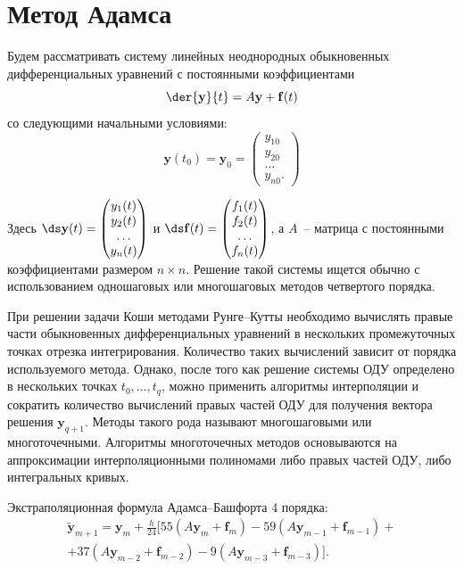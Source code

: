 \documentclass[14pt,final,titlepage,pscyr]{hedwork}
\renewcommand{\vec}[1]{\mathbf{#1}}
\begin{document}
\maketitle
\tableofcontents
\section{Метод Адамса}
  Будем рассматривать систему линейных неоднородных обыкновенных
  дифференциальных уравнений с постоянными коэффициентами
  \[
    \der{\vec{y}}{t} = A\vec{y} + \vec{f}(t)
  \]
  со следующими начальными условиями:
  \[
    \vec{y}(t_0) = \vec{y}_0 =
    \begin{pmatrix}
      y_{10} \\ y_{20} \\ \ldots \\ y_{n0}.
    \end{pmatrix}
  \]
  
  Здесь \( \ds \vec{y}(t) =
  \begin{pmatrix}y_1(t) \\ y_2(t) \\ \ldots \\ y_n(t) \end{pmatrix} \)
  и  \( \ds \vec{f}(t) =
  \begin{pmatrix}f_1(t) \\ f_2(t) \\ \ldots \\ f_n(t) \end{pmatrix} \),
  а \( A \)~-- матрица с постоянными коэффициентами размером \( n \times n \).
  Решение такой системы ищется обычно с использованием одношаговых или
  многошаговых методов четвертого порядка. 

	При решении задачи Коши методами Рунге--Кутты необходимо вычислять правые
	части обыкновенных дифференциальных уравнений в нескольких промежуточных
	точках отрезка интегрирования. Количество таких вычислений зависит от
	порядка используемого метода. Однако, после того как решение системы ОДУ
	определено в нескольких точках \( t_0, \ldots, t_q \), можно применить
	алгоритмы интерполяции и сократить количество вычислений правых частей ОДУ
	для получения вектора решения \( \vec{y}_{q+1} \). Методы такого рода
	называют многошаговыми или многоточечными. Алгоритмы многоточечных методов
	основываются на аппроксимации интерполяционными полиномами либо правых частей
	ОДУ, либо интегральных кривых.
	
  Экстраполяционная формула Адамса--Башфорта 4 порядка:
	\begin{gather*}
	  \widetilde{\vec{y}}_{m+1} = \vec{y}_m + \frac{h}{24}\big[
	    55(A\vec{y}_m + \vec{f}_m) - 59(A\vec{y}_{m-1} + \vec{f}_{m-1}) + \\
    + 37(A\vec{y}_{m-2} + \vec{f}_{m-2}) - 9(A\vec{y}_{m-3} + \vec{f}_{m-3})
	    \big].
	\end{gather*}
	
\end{document}
